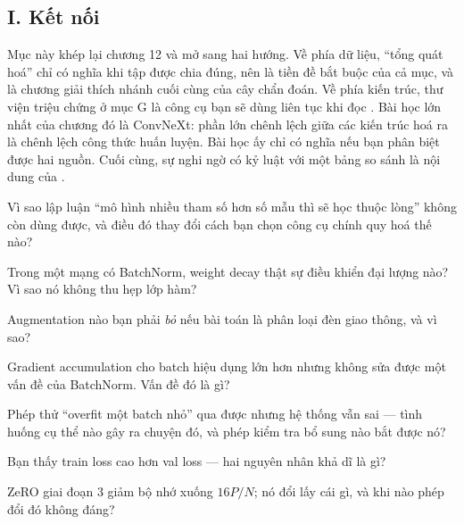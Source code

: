\documentclass[../../../deep_learning.tex]{subfiles}
\begin{document}
\subsection{I. Kết nối}
Mục này khép lại chương 12 và mở sang hai hướng. Về phía dữ liệu, ``tổng quát hoá'' chỉ có nghĩa khi tập được chia đúng, nên  là tiền đề bắt buộc của cả mục, và  là chương giải thích nhánh cuối cùng của cây chẩn đoán. Về phía kiến trúc, thư viện triệu chứng ở mục G là công cụ bạn sẽ dùng liên tục khi đọc . Bài học lớn nhất của chương đó là ConvNeXt: phần lớn chênh lệch giữa các kiến trúc hoá ra là chênh lệch công thức huấn luyện. Bài học ấy chỉ có nghĩa nếu bạn phân biệt được hai nguồn. Cuối cùng, sự nghi ngờ có kỷ luật với một bảng so sánh là nội dung của .

\begin{tukiem}
\item Vì sao lập luận ``mô hình nhiều tham số hơn số mẫu thì sẽ học thuộc lòng'' không còn dùng được, và điều đó thay đổi cách bạn chọn công cụ chính quy hoá thế nào?
\item Trong một mạng có BatchNorm, weight decay thật sự điều khiển đại lượng nào? Vì sao nó không thu hẹp lớp hàm?
\item Augmentation nào bạn phải \emph{bỏ} nếu bài toán là phân loại đèn giao thông, và vì sao?
\item Gradient accumulation cho batch hiệu dụng lớn hơn nhưng không sửa được một vấn đề của BatchNorm. Vấn đề đó là gì?
\item Phép thử ``overfit một batch nhỏ'' qua được nhưng hệ thống vẫn sai --- tình huống cụ thể nào gây ra chuyện đó, và phép kiểm tra bổ sung nào bắt được nó?
\item Bạn thấy train loss cao hơn val loss --- hai nguyên nhân khả dĩ là gì?
\item ZeRO giai đoạn 3 giảm bộ nhớ xuống \(16P/N\); nó đổi lấy cái gì, và khi nào phép đổi đó không đáng?
\end{tukiem}
\ifSubfilesClassLoaded{\printbibliography[title={Nguồn}]}{}
\end{document}
